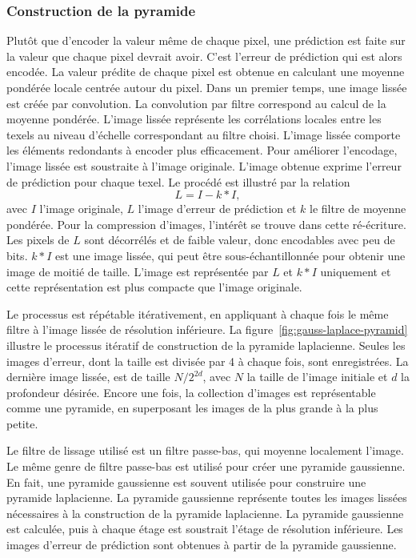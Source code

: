 \subsubsection{Construction de la pyramide}

Plutôt que d'encoder la valeur même de chaque pixel, une prédiction est faite sur la valeur que chaque pixel devrait avoir. C'est l'erreur de prédiction qui est alors encodée. La valeur prédite de chaque pixel est obtenue en calculant une moyenne pondérée locale centrée autour du pixel. Dans un premier temps, une image lissée est créée par convolution. La convolution par filtre correspond au calcul de la moyenne pondérée. L'image lissée représente les corrélations locales entre les texels au niveau d'échelle correspondant au filtre choisi. L'image lissée comporte les éléments redondants à encoder plus efficacement. Pour améliorer l'encodage, l'image lissée est soustraite à l'image originale. L'image obtenue exprime l'erreur de prédiction pour chaque texel. Le procédé est illustré par la relation
\begin{equation}
    L = I - k * I,
\end{equation}
avec $I$ l'image originale, $L$ l'image d'erreur de prédiction et $k$ le filtre de moyenne pondérée. Pour la compression d'images, l'intérêt se trouve dans cette ré-écriture. Les pixels de $L$ sont décorrélés et de faible valeur, donc encodables avec peu de bits. $k*I$ est une image lissée, qui peut être sous-échantillonnée pour obtenir une image de moitié de taille. L'image est représentée par $L$ et $k*I$ uniquement et cette représentation est plus compacte que l'image originale.

\bigskip

Le processus est répétable itérativement, en appliquant à chaque fois le même filtre à l'image lissée de résolution inférieure. La figure~\ref{fig:gauss-laplace-pyramid} illustre le processus itératif de construction de la pyramide laplacienne. Seules les images d'erreur, dont la taille est divisée par 4 à chaque fois, sont enregistrées. La dernière image lissée, est de taille $N/2^{2d}$, avec $N$ la taille de l'image initiale et $d$ la profondeur désirée. Encore une fois, la collection d'images est représentable comme une pyramide, en superposant les images de la plus grande à la plus petite.

\bigskip

Le filtre de lissage utilisé est un filtre passe-bas, qui moyenne localement l'image. Le même genre de filtre passe-bas est utilisé pour créer une pyramide gaussienne. En fait, une pyramide gaussienne est souvent utilisée pour construire une pyramide laplacienne. La pyramide gaussienne représente toutes les images lissées nécessaires à la construction de la pyramide laplacienne. La pyramide gaussienne est calculée, puis à chaque étage est soustrait l'étage de résolution inférieure. Les images d'erreur de prédiction sont obtenues à partir de la pyramide gaussienne.

